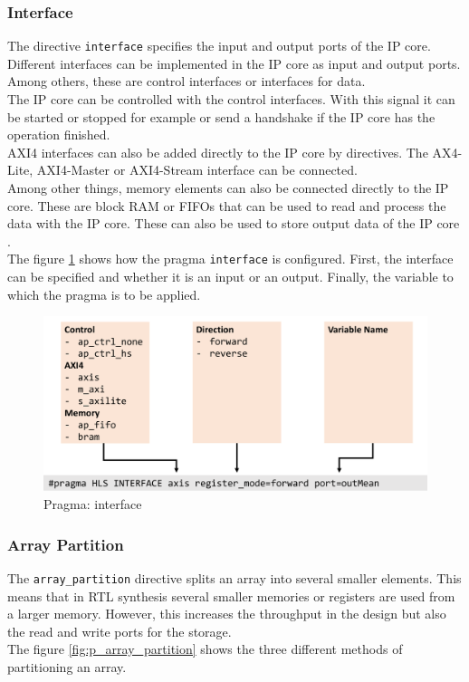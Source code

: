 \subsubsection*{Interface}
The directive \texttt{interface} specifies the input and output ports of the IP core. Different interfaces can be implemented in the IP core as input and output ports. Among others, these are control interfaces or interfaces for data. \\
The IP core can be controlled with the control interfaces. With this signal it can be started or stopped for example or send a handshake if the IP core has the operation finished. \\
AXI4 interfaces can also be added directly to the IP core by directives. The AX4-Lite, AXI4-Master or AXI4-Stream interface can be connected. \\
Among other things, memory elements can also be connected directly to the IP core. These are block RAM or FIFOs that can be used to read and process the data with the IP core. These can also be used to store output data of the IP core \cite{pragma}. \\
The figure \ref{fig:p_interface} shows how the pragma \texttt{interface} is configured. First, the interface can be specified and whether it is an input or an output. Finally, the variable to which the pragma is to be applied.

\begin{figure}[tb!]
    \centering
    \includegraphics[width=\textwidth]{images/theory/interface.png}
    \caption{Pragma: interface}
    \label{fig:p_interface}
\end{figure}

\subsubsection*{Array Partition}
The \texttt{array\_partition} directive splits an array into several smaller elements. This means that in RTL synthesis several smaller memories or registers are used from a larger memory. However, this increases the throughput in the design but also the read and write ports for the storage. \\
The figure \ref{fig:p_array_partition} shows the three different methods of partitioning an array.

